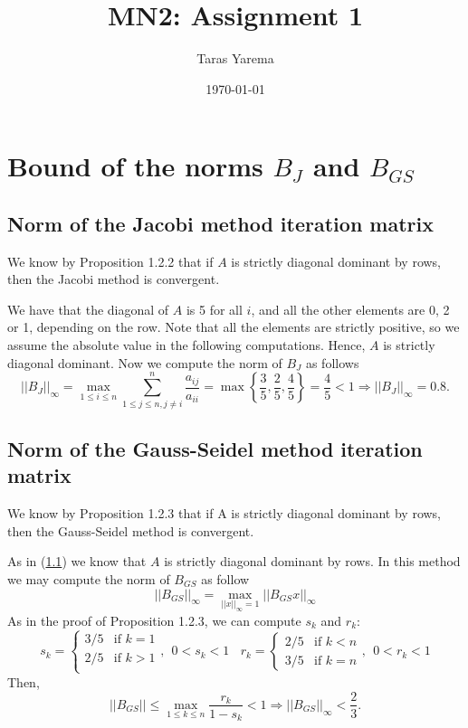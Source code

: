 \documentclass[12pt]{article}
\title{MN2: Assignment 1}
\author{Taras Yarema}
\date{\today}
\begin{document}
\maketitle

\section{Bound of the norms $B_{J}$ and $B_{GS}$}

\subsection{Norm of the Jacobi method iteration matrix}
\label{bound:jacobi}

We know by Proposition 1.2.2 \cite{MN2:1} that if $A$ is strictly diagonal dominant by rows, then
the Jacobi method is convergent.

We have that the diagonal of $A$ is 5 for all $i$, and all the other elements are 0, 2 or 1, depending on the row.
Note that all the elements are strictly positive, so we assume the absolute value in the following computations.
Hence, $A$ is strictly diagonal dominant.
Now we compute the norm of $B_{J}$ as follows
$$
||B_{J}||_\infty = \max_{1\leq i \leq n} \sum_{1 \leq j \leq n, j\neq i}^{n} \frac{a_{ij}}{a_{ii}} 
= \max \left \{ \frac{3}{5}, \frac{2}{5}, \frac{4}{5} \right \} 
= \frac{4}{5} < 1
\Rightarrow
||B_{J}||_\infty = 0.8.
$$

\subsection{Norm of the Gauss-Seidel method iteration matrix}
\label{bound:gs}

We know by Proposition 1.2.3 \cite{MN2:1} that if A is strictly diagonal dominant by rows, then
the Gauss-Seidel method is convergent.

As in (\ref{bound:jacobi}) we know that $A$ is strictly diagonal dominant by rows.
In this method we may compute the norm of $B_{GS}$ as follow
$$
||B_{GS}||_\infty = \max_{||x||_\infty = 1} ||B_{GS}x||_\infty
$$
As in the proof of Proposition 1.2.3, we can compute $s_k$ and $r_k$:
$$
s_k = 
\begin{cases} 
3/5 &\mbox{if } k = 1 \\
2/5 &\mbox{if } k > 1 \\
\end{cases}, \ \
0 < s_k < 1
\ \ \ \
r_k = 
\begin{cases} 
2/5 &\mbox{if } k < n \\
3/5 &\mbox{if } k = n 
\end{cases}, \ \
0 < r_k < 1
$$
Then,
$$
||B_{GS}|| \leq \max_{1 \leq k \leq n} \frac{r_k}{1 - s_k} < 1
\Rightarrow
||B_{GS}||_\infty < \frac{2}{3}.
$$
\end{document}
